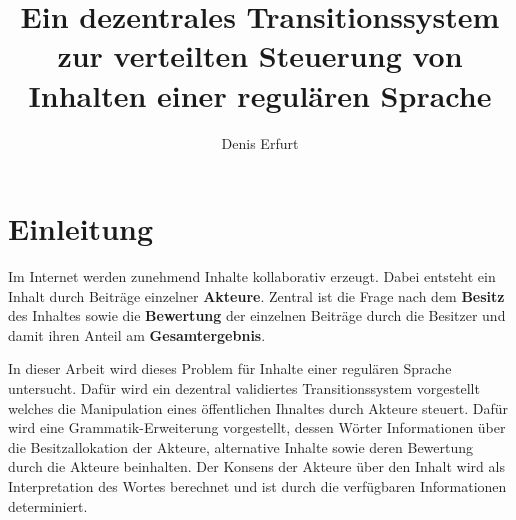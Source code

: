 \documentclass[]{article}
\author{Denis Erfurt}
\date{\now}
\title{Ein dezentrales Transitionssystem zur verteilten Steuerung von Inhalten einer regulären Sprache}
\begin{document}
\tableofcontents


\newpage

\section{Einleitung}

Im Internet werden zunehmend Inhalte kollaborativ erzeugt. 
Dabei entsteht ein Inhalt durch Beiträge einzelner \textbf{Akteure}.
Zentral ist die Frage nach dem \textbf{Besitz} des Inhaltes sowie die \textbf{Bewertung} der einzelnen Beiträge durch die Besitzer und damit ihren Anteil am \textbf{Gesamtergebnis}. 




In dieser Arbeit wird dieses Problem für Inhalte einer regulären Sprache untersucht. Dafür wird ein dezentral validiertes Transitionssystem vorgestellt welches die Manipulation eines öffentlichen Ihnaltes durch Akteure steuert. Dafür wird eine Grammatik-Erweiterung vorgestellt, dessen Wörter Informationen über die Besitzallokation der Akteure, alternative Inhalte sowie deren Bewertung durch die Akteure beinhalten. Der Konsens der Akteure über den Inhalt wird als Interpretation des Wortes berechnet und ist durch die verfügbaren Informationen determiniert. 


\newpage



\end{document}
